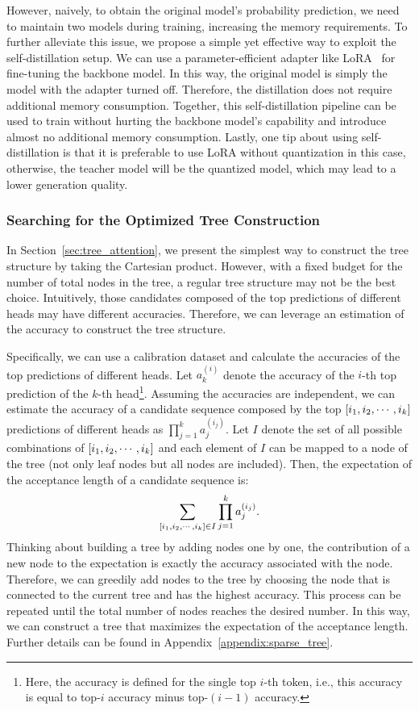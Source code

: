 However, naively, to obtain the original model's probability prediction, we need to maintain two models during training, increasing the memory requirements. To further alleviate this issue, we propose a simple yet effective way to exploit the self-distillation setup. We can use a parameter-efficient adapter like LoRA~\citep{hu2021lora} for fine-tuning the backbone model. In this way, the original model is simply the model with the adapter turned off. Therefore, the distillation does not require additional memory consumption. Together, this self-distillation pipeline can be used to train  without hurting the backbone model's capability and introduce almost no additional memory consumption. Lastly, one tip about using self-distillation is that it is preferable to use LoRA without quantization in this case, otherwise, the teacher model will be the quantized model, which may lead to a lower generation quality.

\subsubsection{Searching for the Optimized Tree Construction}
\label{sec:optimized_tree_construction}
In Section~\ref{sec:tree_attention}, we present the simplest way to construct the tree structure by taking the Cartesian product. However, with a fixed budget for the number of total nodes in the tree, a regular tree structure may not be the best choice. Intuitively, those candidates composed of the top predictions of different heads may have different accuracies. Therefore, we can leverage an estimation of the accuracy to construct the tree structure.

Specifically, we can use a calibration dataset and calculate the accuracies of the top predictions of different heads. Let $a_k^{(i)}$ denote the accuracy of the $i$-th top prediction of the $k$-th head\footnote{Here, the accuracy is defined for the single top $i$-th token, i.e., this accuracy is equal to top-$i$ accuracy minus top-$(i-1)$ accuracy.}. Assuming the accuracies are independent, we can estimate the accuracy of a candidate sequence composed by the top $\left[i_1, i_2, \cdots, i_k\right]$ predictions of different heads as $\prod_{j=1}^k a_j^{(i_j)}$. Let $I$ denote the set of all possible combinations of $\left[i_1, i_2, \cdots, i_k\right]$ and each element of $I$ can be mapped to a node of the tree (not only leaf nodes but all nodes are included). Then, the expectation of the acceptance length of a candidate sequence is:
\begin{align*}
    \sum_{\left[i_1, i_2, \cdots, i_k\right]\in I}\prod_{j=1}^k a_j^{(i_j)}.
\end{align*}
Thinking about building a tree by adding nodes one by one, the contribution of a new node to the expectation is exactly the accuracy associated with the node. Therefore, we can greedily add nodes to the tree by choosing the node that is connected to the current tree and has the highest accuracy. This process can be repeated until the total number of nodes reaches the desired number. In this way, we can construct a tree that maximizes the expectation of the acceptance length. Further details can be found in Appendix~\ref{appendix:sparse_tree}.

